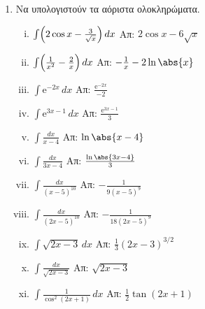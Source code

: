 \documentclass[a4paper,table]{report}
\begin{document}
\begin{center}
  \minibox{{\large\bfseries \textcolor{Col1}{Ασκήσεις στα Αόριστα Ολοκληρώματα}}}
\end{center}

\vspace{\baselineskip}


\begin{enumerate}
  \item Να υπολογιστούν τα αόριστα ολοκληρώματα.
    \begin{enumerate}[i)]
      \item $\int \Bigl(2 \cos{x} - \frac{3}{\sqrt{x}}\Bigr) \, dx $ 
        \hfill Απ: $ 2 \cos{x} - 6 \sqrt{x} $  
      \item $\int \Bigl(\frac{1}{x^{2}} - \frac{2}{x}\Bigr) \, dx  $ 
        \hfill Απ: $ - \frac{1}{x} - 2 \ln{\abs{x}} $
      \item $\int \mathrm{e}^{-2x} \, dx $ \hfill Απ: $ \frac{\mathrm{e}^{-2x}}{-2} $
      \item $\int \mathrm{e}^{3x-1} \, dx $ \hfill Απ: $ \frac{\mathrm{e}^{3x-1}}{3} $
      \item $\int\frac{dx}{x-4} $ \hfill Απ: $ \ln{\abs{x-4}}$
      \item $\int\frac{dx}{3x-4} $ \hfill Απ: $ \frac{\ln{\abs{3x-4}}}{3} $
      \item $\int\frac{dx}{(x-5)^{10}} $ \hfill Απ: $-\frac{1}{9(x-5)^9}$
      \item $\int\frac{dx}{(2x-5)^{10}} $ \hfill Απ: $-\frac{1}{18(2x-5)^9}$
      \item $ \int \sqrt{2x-3} \, dx $ \hfill Απ: $ \frac{1}{3} (2x-3)^{3/2} $
      \item $ \int\frac{dx}{\sqrt{2x-3}}$ \hfill Απ: $ \sqrt{2x-3} $
      \item $ \int \frac{1}{\cos^{2}{(2x+1)}} \,{dx} $ 
        \hfill Απ: $ \frac{1}{2} \tan{(2x+1)} $ 
    \end{enumerate}

\end{enumerate}
\end{document}
